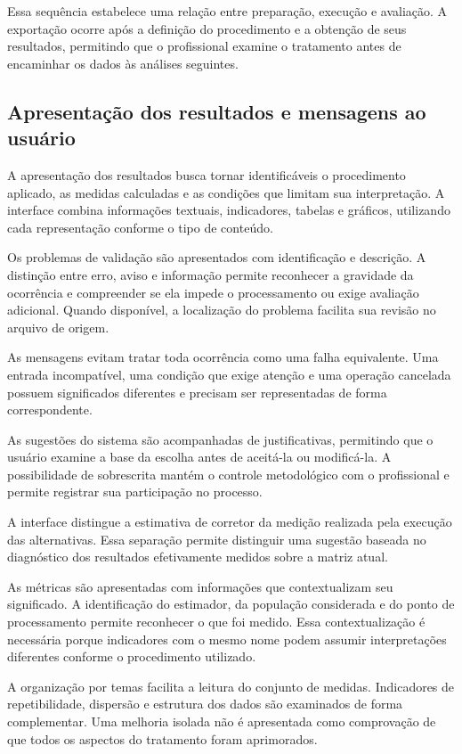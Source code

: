 Essa sequência estabelece uma relação entre preparação, execução e avaliação. A exportação ocorre após a definição do procedimento e a obtenção de seus resultados, permitindo que o profissional examine o tratamento antes de encaminhar os dados às análises seguintes.

\subsection{Apresentação dos resultados e mensagens ao usuário}
\label{subsec:resultados-mensagens}

A apresentação dos resultados busca tornar identificáveis o procedimento aplicado, as medidas calculadas e as condições que limitam sua interpretação. A interface combina informações textuais, indicadores, tabelas e gráficos, utilizando cada representação conforme o tipo de conteúdo.

Os problemas de validação são apresentados com identificação e descrição. A distinção entre erro, aviso e informação permite reconhecer a gravidade da ocorrência e compreender se ela impede o processamento ou exige avaliação adicional. Quando disponível, a localização do problema facilita sua revisão no arquivo de origem.

As mensagens evitam tratar toda ocorrência como uma falha equivalente. Uma entrada incompatível, uma condição que exige atenção e uma operação cancelada possuem significados diferentes e precisam ser representadas de forma correspondente.

As sugestões do sistema são acompanhadas de justificativas, permitindo que o usuário examine a base da escolha antes de aceitá-la ou modificá-la. A possibilidade de sobrescrita mantém o controle metodológico com o profissional e permite registrar sua participação no processo.

A interface distingue a estimativa de corretor da medição realizada pela execução das alternativas. Essa separação permite distinguir uma sugestão baseada no diagnóstico dos resultados efetivamente medidos sobre a matriz atual.

As métricas são apresentadas com informações que contextualizam seu significado. A identificação do estimador, da população considerada e do ponto de processamento permite reconhecer o que foi medido. Essa contextualização é necessária porque indicadores com o mesmo nome podem assumir interpretações diferentes conforme o procedimento utilizado.

A organização por temas facilita a leitura do conjunto de medidas. Indicadores de repetibilidade, dispersão e estrutura dos dados são examinados de forma complementar. Uma melhoria isolada não é apresentada como comprovação de que todos os aspectos do tratamento foram aprimorados.

